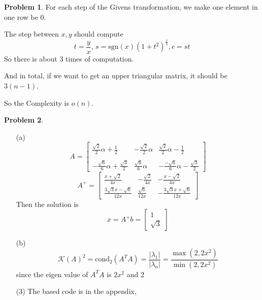 \documentclass[a4paper]{article}
\theoremstyle{definition}
\newtheorem{problem}{Problem}
\theoremstyle{plain}
\newcommand{\cond}[1]{\mathrm{cond}_{#1}}
\newcommand{\sgn}{\mathrm{sgn}}
\newcommand{\dps}{\displaystyle}
\numberwithin{equation}{problem}
\begin{document}
\begin{problem}
    For each step of the Givens transformation, we make one element in one row be $ 0 $.
    
    The step between  $ x,y $  should compute 
    \[t=\frac{y}{x},\,s=\sgn(x)(1+t^2)^{\frac{1}{2}},c=st\]
    So there is about  $ 3 $ times of computation.

    And in total, if we want to get an upper triangular matrix, it should be  $ 3(n-1) $.
    
    So the Complexity is  $ o(n) $. 
\end{problem}

\begin{problem}
    \begin{enumerate}
        \item[(a)] \begin{equation}
            A=\begin{bmatrix}
                \dps\frac{\sqrt{2}}{2}\alpha+\frac{1}{2}&-\dps\frac{\sqrt{2}}{2}\alpha&\dps\frac{\sqrt{2}}{2}\alpha-\dps\frac{1}{2}\\
                \\
                -\dps\frac{\sqrt{6}}{6}\alpha+\dps\frac{\sqrt{3}}{2}&\dps\frac{\sqrt{6}}{6}\alpha&\dps-\frac{-\sqrt{6}}{6}\alpha-\frac{\sqrt{3}}{2}
            \end{bmatrix}
        \end{equation}
        \begin{equation}
            A^+=\begin{bmatrix}
                           \dps\frac{x + \sqrt{2}}{4x}& -\dps\frac{\sqrt{2}}{4x}&\dps            -\frac{x - \sqrt{2}}{4x}\\
                \dps\frac{3\sqrt{3}x - \sqrt{6}}{12x}& \dps\frac{\sqrt{6}}{12x}& \dps-\frac{3\sqrt{3}x+\sqrt{6}}{12x}
            \end{bmatrix}
        \end{equation}
        Then the solution is 
        \[x=A^+b=\begin{bmatrix}
            
          1\\
          \sqrt{3}         
        \end{bmatrix}\]
        \item[(b)]
         \[\mathcal{K}(A)^2=\cond{2}(A^TA)=\dps\frac{|\lambda_1|}{|\lambda_n|}=\dps\frac{\max(2,2x^2)}{\min(2,2x^2)}\]
         since the eigen value of  $ A^TA $ is  $ 2x^2 $ and  $ 2 $ 
         \item[(3)]The based code is in the appendix, 
         \item[] 
         \appendix
         


\end{enumerate}
\end{problem}
\end{document}
